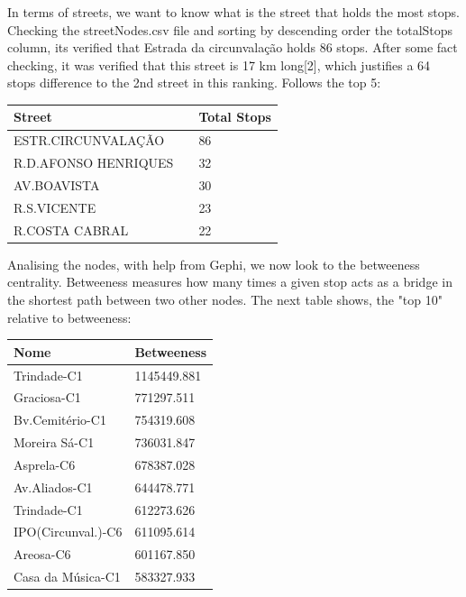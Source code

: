 \documentclass[12pt]{article}
\begin{document}
\begin{multicols}{2}
In terms of streets, we want to know what is the street that holds the most stops. Checking the streetNodes.csv file and sorting by descending order the totalStops column, its verified that Estrada da circunvalação holds 86 stops. After some fact checking, it was verified that this street is 17 km long[2], which justifies a 64 stops difference to the 2nd street in this ranking. Follows the top 5:
\begin{center}
\begin{tabular}[h]{|l|ll|}
\hline
Street && Total Stops\\
\hline
ESTR.CIRCUNVALAÇÃO && 86\\
R.D.AFONSO HENRIQUES && 32\\
AV.BOAVISTA	&& 30\\
R.S.VICENTE	&& 23\\
R.COSTA CABRAL && 22\\
\hline
\end{tabular}
\end{center} 
Analising the nodes, with help from Gephi, we now look to the betweeness centrality. Betweeness measures how many times a given stop acts as a bridge in the shortest path between two other nodes. The next table shows, the "top 10" relative to betweeness:\\
\begin{tabular}[h]{|l|l|}
\hline
	Nome 				& Betweeness\\
	\hline
	Trindade-C1 		& 1145449.881\\%
	Graciosa-C1 		& 771297.511\\%
	Bv.Cemitério-C1 	& 754319.608\\%
	Moreira Sá-C1 		& 736031.847\\%
	Asprela-C6 			& 678387.028\\%
	Av.Aliados-C1 		& 644478.771\\%
	Trindade-C1			& 612273.626\\%
	IPO(Circunval.)-C6 	& 611095.614\\%
	Areosa-C6 			& 601167.850\\%
	Casa da Música-C1 	& 583327.933\\%
\hline
\end{tabular}



\end{multicols}
\end{document}
